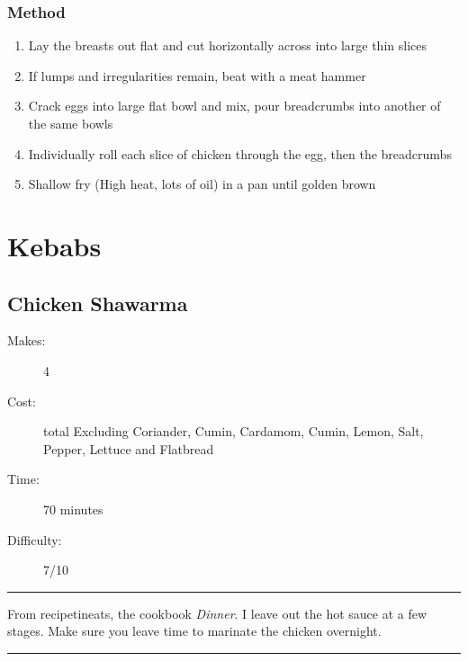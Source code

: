 \documentclass[]{article}
\begin{document}
\subsubsection*{\Large Method}
\begin{enumerate}[font=\huge\color{accent}]
	\item Lay the breasts out flat and cut horizontally across into large thin slices
	\item If lumps and irregularities remain, beat with a meat hammer
	\item Crack eggs into large flat bowl and mix, pour breadcrumbs into another of the same bowls
	\item Individually roll each slice of chicken through the egg, then the breadcrumbs
	\item Shallow fry (High heat, lots of oil) in a pan until golden brown
\end{enumerate}
\newpage
{}
\section*{\center\Huge\color{accent}Kebabs}
\label{cat:Kebabs}
\label{rec:Chicken Shawarma}
\subsection*{\center\huge Chicken Shawarma}
\begin{description}
\item[Makes:] 4 
\item[Cost:]  total Excluding Coriander, Cumin, Cardamom, Cumin, Lemon, Salt, Pepper, Lettuce and Flatbread
\item[Time:] 70 minutes
\item[Difficulty:] 7/10
\end{description}
\vspace{0.2cm}\hrule\vspace{0.5cm}
\begin{adjustwidth}{0.5 cm}{0.5 cm}

From recipetineats, the cookbook \textit{Dinner}. I leave out the hot sauce at a few stages. Make sure you leave time to marinate the chicken overnight. \hfill{}\color{black}

\end{adjustwidth}
\vspace{0.5cm}\hrule
\end{document}
